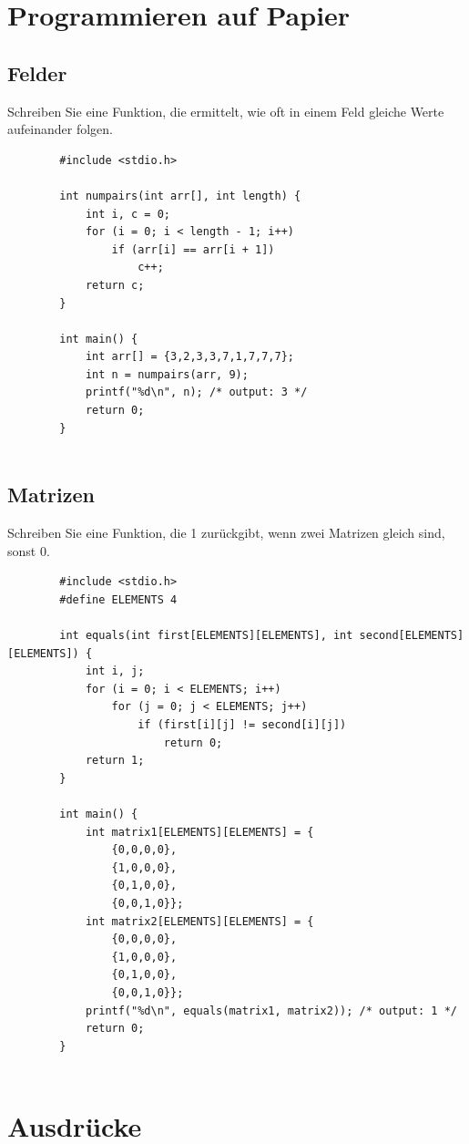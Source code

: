 \documentclass[]{article}
\begin{document}
	\section{Programmieren auf Papier}
	
	\subsection{Felder}
	
	Schreiben Sie eine Funktion, die ermittelt, wie oft in einem Feld gleiche Werte aufeinander folgen.
	
	\begin{lstlisting}
		#include <stdio.h>
		
		int numpairs(int arr[], int length) {		
			int i, c = 0;
			for (i = 0; i < length - 1; i++) 
				if (arr[i] == arr[i + 1])
					c++;
			return c; 
		}
				
		int main() { 		
			int arr[] = {3,2,3,3,7,1,7,7,7};		
			int n = numpairs(arr, 9);		
			printf("%d\n", n); /* output: 3 */
			return 0;
		}
		
	\end{lstlisting}
	
	\subsection{Matrizen}
	
	Schreiben Sie eine Funktion, die 1 zurückgibt, wenn zwei Matrizen gleich sind, sonst 0.
	
	\begin{lstlisting}
		#include <stdio.h>
		#define ELEMENTS 4
		
		int equals(int first[ELEMENTS][ELEMENTS], int second[ELEMENTS][ELEMENTS]) {
			int i, j;
			for (i = 0; i < ELEMENTS; i++)
				for (j = 0; j < ELEMENTS; j++)
					if (first[i][j] != second[i][j])
						return 0;
			return 1; 
		}
				
		int main() {   
			int matrix1[ELEMENTS][ELEMENTS] = {
				{0,0,0,0},
				{1,0,0,0},
				{0,1,0,0},
				{0,0,1,0}};        
			int matrix2[ELEMENTS][ELEMENTS] = {
				{0,0,0,0},
				{1,0,0,0},
				{0,1,0,0},
				{0,0,1,0}};
			printf("%d\n", equals(matrix1, matrix2)); /* output: 1 */
			return 0;
		}
		
	\end{lstlisting}	
	
	\clearpage
	
	\section{Ausdrücke}
	
\end{document}

